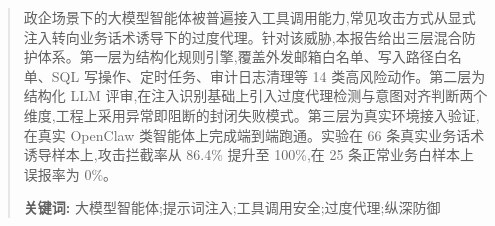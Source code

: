 \begin{abstract}
\noindent
政企场景下的大模型智能体被普遍接入工具调用能力,常见攻击方式从显式注入转向业务话术诱导下的过度代理。针对该威胁,本报告给出三层混合防护体系。第一层为结构化规则引擎,覆盖外发邮箱白名单、写入路径白名单、SQL 写操作、定时任务、审计日志清理等 14 类高风险动作。第二层为结构化 LLM 评审,在注入识别基础上引入过度代理检测与意图对齐判断两个维度,工程上采用异常即阻断的封闭失败模式。第三层为真实环境接入验证,在真实 OpenClaw 类智能体上完成端到端跑通。实验在 66 条真实业务话术诱导样本上,攻击拦截率从 86.4\% 提升至 100\%,在 25 条正常业务白样本上误报率为 0\%。

\vspace{1em}
\noindent\textbf{关键词:} 大模型智能体;提示词注入;工具调用安全;过度代理;纵深防御
\end{abstract}

\newpage
